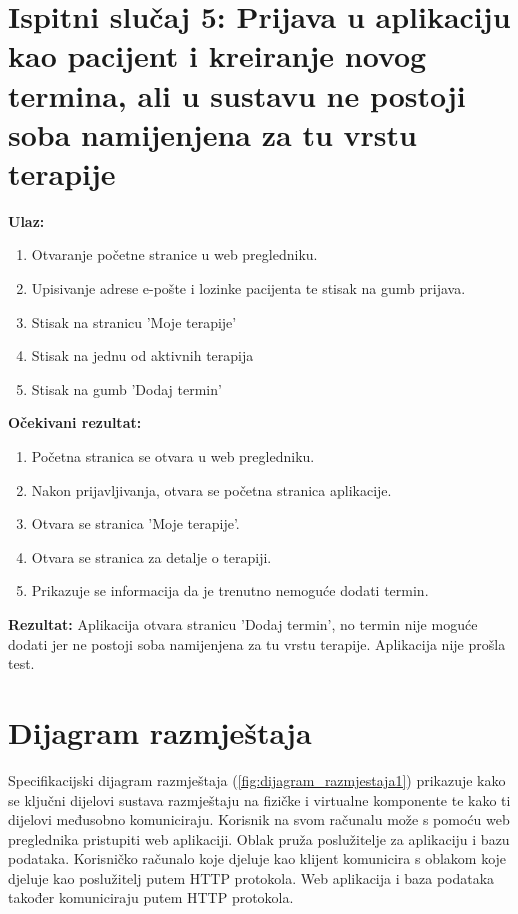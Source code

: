 \section*{Ispitni slučaj 5: Prijava u aplikaciju kao pacijent i kreiranje novog termina, ali u sustavu ne postoji soba namijenjena za tu vrstu terapije}
\textbf{Ulaz:}
\begin{enumerate}[label=\arabic*.]
    \item Otvaranje početne stranice u web pregledniku.
    \item Upisivanje adrese e-pošte i lozinke pacijenta te stisak na gumb prijava.
    \item Stisak na stranicu 'Moje terapije'
    \item Stisak na jednu od aktivnih terapija
    \item Stisak na gumb 'Dodaj termin'
\end{enumerate}
\textbf{Očekivani rezultat:}
\begin{enumerate}[label=\arabic*.]
    \item Početna stranica se otvara u web pregledniku.   
    \item Nakon prijavljivanja, otvara se početna stranica aplikacije.
    \item Otvara se stranica 'Moje terapije'.
    \item Otvara se stranica za detalje o terapiji.
    \item Prikazuje se informacija da je trenutno nemoguće dodati termin.
\end{enumerate}
\textbf{Rezultat:} Aplikacija otvara stranicu 'Dodaj termin', no termin nije moguće dodati jer ne postoji soba namijenjena za tu vrstu terapije. Aplikacija nije prošla test.
			 

		
		
		\section{Dijagram razmještaja}
			
			 Specifikacijski dijagram razmještaja (\ref{fig:dijagram_razmjestaja1}) prikazuje kako se ključni dijelovi sustava razmještaju na fizičke i virtualne komponente te kako ti dijelovi međusobno komuniciraju.
			 Korisnik na svom računalu može s pomoću web preglednika pristupiti web aplikaciji. Oblak pruža poslužitelje za aplikaciju i bazu podataka. Korisničko računalo koje djeluje kao klijent komunicira s oblakom koje djeluje kao poslužitelj putem HTTP protokola. Web aplikacija i baza podataka također komuniciraju putem HTTP protokola.
			 
